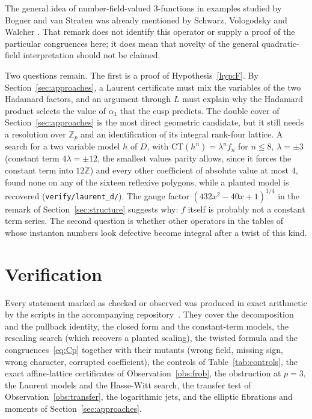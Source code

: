 \documentclass[11pt]{amsart}
\theoremstyle{definition}
\theoremstyle{remark}
\newcommand{\Z}{\mathbb{Z}}
\begin{document}
The general idea of number-field-valued $3$-functions in examples studied by Bogner and van Straten was already mentioned by Schwarz, Vologodsky and Walcher \cite[footnote~9]{SVW}. That remark does not identify this operator or supply a proof of the particular congruences here; it does mean that novelty of the general quadratic-field interpretation should not be claimed.

Two questions remain. The first is a proof of Hypothesis~\ref{hyp:F}. By
Section~\ref{sec:approaches}, a Laurent certificate must mix the variables of the two Hadamard
factors, and an argument through $L$ must explain why the Hadamard product selects the value of
$\alpha_1$ that the cusp predicts. The double cover of Section~\ref{sec:approaches} is the most
direct geometric candidate, but it still needs a resolution over $\Z_p$ and an identification of
its integral rank-four lattice. A search for a two
variable model $h$ of $D$, with $\mathrm{CT}(h^n)=\lambda^nf_n$ for $n\le8$, $\lambda=\pm3$ (constant term
$4\lambda=\pm12$, the smallest values parity allows, since it forces the constant term into $12\Z$) and every other coefficient of
absolute value at most $4$, found none on any of the sixteen reflexive polygons, while a planted model
is recovered (\texttt{verify/laurent\_d/}). The gauge factor $(432x^2-40x+1)^{1/4}$ in the
remark of Section~\ref{sec:structure} suggests why: $f$ itself is probably not a constant term
series. The second question is whether other operators in the tables of \cite{AESZ} whose instanton
numbers look defective become integral after a twist of this kind.

\section{Verification}\label{sec:data}

Every statement marked as checked or observed was produced in exact arithmetic by the scripts in
the accompanying repository~\cite{repo}. They cover the decomposition and the pullback identity, the
closed form and the constant-term models, the rescaling search (which recovers a planted scaling),
the twisted formula and the congruences~\eqref{eq:Cp} together with their mutants (wrong field,
missing sign, wrong character, corrupted coefficient), the controls of Table~\ref{tab:controls}, the
exact affine-lattice certificates of Observation~\ref{obs:frob}, the obstruction at $p=3$, the
Laurent models and the Hasse-Witt search, the transfer test of Observation~\ref{obs:transfer}, the
logarithmic jets, and the elliptic fibrations and moments of Section~\ref{sec:approaches}.
\end{document}
